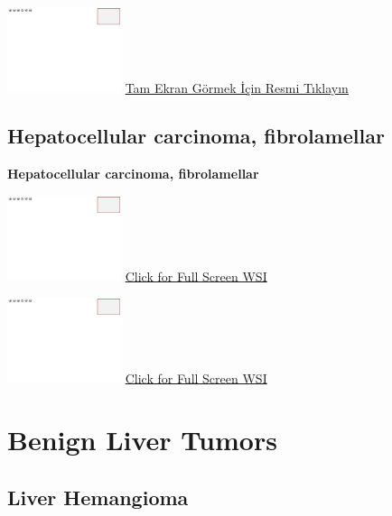 \documentclass[
  letterpaper,
  paper=6in:9in,
  pagesize=pdftex,
  headinclude=on,
  footinclude=on,
  12pt]{scrbook}
\begin{document}
\href{https://images.patolojiatlasi.com/template/HE.html}{\includegraphics[width=0.25\textwidth,height=\textheight]{./screenshots/template_screenshot.png}}
\href{https://images.patolojiatlasi.com/hepatocellularcarcinoma/HCC/viewer_z0.html}{Tam
Ekran Görmek İçin Resmi Tıklayın}

\hypertarget{sec-hepatocellular-carcinoma-fibrolamellar}{%
\section{Hepatocellular carcinoma,
fibrolamellar}\label{sec-hepatocellular-carcinoma-fibrolamellar}}

\textbf{Hepatocellular carcinoma, fibrolamellar}

\href{https://images.patolojiatlasi.com/template/HE.html}{\includegraphics[width=0.25\textwidth,height=\textheight]{./screenshots/template_screenshot.png}}
\href{https://images.patolojiatlasi.com/fibrolamellar-hepatocellular-carcinoma/HE1.html}{Click
for Full Screen WSI}

\href{https://images.patolojiatlasi.com/template/HE.html}{\includegraphics[width=0.25\textwidth,height=\textheight]{./screenshots/template_screenshot.png}}
\href{https://images.patolojiatlasi.com/fibrolamellar-hepatocellular-carcinoma/HE4.html}{Click
for Full Screen WSI}

\hypertarget{sec-benign-liver-tumors}{%
\chapter{Benign Liver Tumors}\label{sec-benign-liver-tumors}}

\hypertarget{sec-liver-hemangioma}{%
\section{Liver Hemangioma}\label{sec-liver-hemangioma}}
\end{document}
